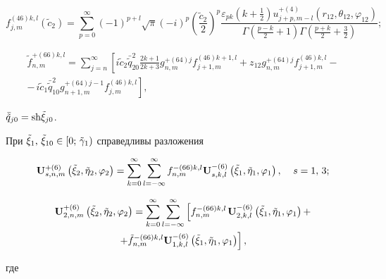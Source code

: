 \begin{theorem}
\begin{equation}\label{eq:1:82}
f_{j,m}^{(46)k,l}({\tilde c_2}) = \sum\limits_{p = 0}^\infty  {{{( - 1)}^{p + l}}} \sqrt \pi  {( - i)^p}{\left( {\frac{{{{\tilde c}_2}}}{2}} \right)^p}\frac{{{\varepsilon _{pk}}\left( {k + \frac{1}{2}} \right)u_{j + p,m - l}^{ + (4)}\left( {{r_{12}},{\theta _{12}},{\varphi _{12}}} \right)}}{{\Gamma \left( {\frac{{p - k}}{2} + 1} \right)\Gamma \left( {\frac{{p + k}}{2} + \frac{3}{2}} \right)}};
\end{equation}

\begin{multline}\label{eq:1:83}
\tilde f_{n,m}^{ + (66)k,l} = \sum\limits_{j = n}^\infty  {\left[ {i{{\tilde c}_2}\bar{\tilde q}_{20}^2\frac{{2k + 1}}{{2k + 3}}} \right.} g_{n,m}^{ + (64)j}f_{j + 1,m}^{(46)k + 1,l} + {z_{12}}g_{n,m}^{ + (64)j}f_{j + 1,m}^{(46)k,l} - \\
- \left. {\frac{{}}{{}}i{{\tilde c}_1}\bar{\tilde q}_{10}^2g_{n + 1,m}^{ + (64)j - 1}f_{j,m}^{(46)k,l}} \right],
\end{multline}

\noindent ${\bar{\tilde q}_{j0}} = {\mathop{\rm sh}\nolimits} {\tilde \xi _{j0}}$.

При ${\tilde \xi _1},{\mkern 1mu} {\kern 1pt} {\tilde \xi _{10}} \in \left[ {0;{\mkern 1mu} {\kern 1pt} {{\tilde \gamma }_1}} \right)$ справедливы разложения

\begin{equation}\label{eq:1:84}
{\bf{U}}_{s,n,m}^{ + (6)}\left( {{{\tilde \xi }_2},{{\tilde \eta }_2},{\varphi _2}} \right) = \sum\limits_{k = 0}^\infty  {\sum\limits_{l =  - \infty }^\infty  {f_{n,m}^{ - (66)k,l}} } {\bf{U}}_{s,k,l}^{ - (6)}\left( {{{\tilde \xi }_1},{{\tilde \eta }_1},{\varphi _1}} \right), \quad {\kern 1pt} s = 1,{\mkern 1mu} {\kern 1pt} 3;
\end{equation}

\begin{multline}\label{eq:1:85}
{\bf{U}}_{2,n,m}^{ + (6)}\left( {{{\tilde \xi }_2},{{\tilde \eta }_2},{\varphi _2}} \right) = \sum\limits_{k = 0}^\infty  {\sum\limits_{l =  - \infty }^\infty  {\left[ {f_{n,m}^{ - (66)k,l}} \right.} } {\bf{U}}_{2,k,l}^{ - (6)}\left( {{{\tilde \xi }_1},{{\tilde \eta }_1},{\varphi _1}} \right) + \\
\left. { + \tilde f_{n,m}^{ - (66)k,l}{\bf{U}}_{1,k,l}^{ - (6)}\left( {{{\tilde \xi }_1},{{\tilde \eta }_1},{\varphi _1}} \right)} \right],
\end{multline}

\noindent где


\end{theorem}
